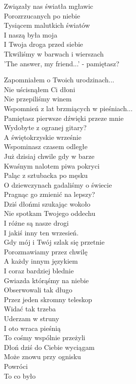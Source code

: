 
\begin{text}
    Związały nas światła mgławic\\
    Porozrzucanych po niebie\\
    Tysiącem malutkich światów\\
    I naszą była moja\\
    I Twoja droga przed siebie\\
    Tkwiliśmy w barwach i wierszach\\
    'The answer, my friend...' - pamiętasz?

    Zapomniałem o Twoich urodzinach...\\
    Nie uścisnąłem Ci dłoni\\
    Nie przepiliśmy winem\\
    Wspomnień z lat brzmiących w pieśniach...\\
    Pamiętasz pierwsze dźwięki przeze mnie\\
    Wydobyte z ogranej gitary?\\
    A świętokrzyskie wrześnie\\
    Wspominasz czasem odległe\\
    Już dzisiaj chwile gdy w barze\\
    Kwaśnym nalotem piwa pokryci\\
    Paląc z sztubacka po męsku\\
    O dziewczynach gadaliśmy o świecie\\
    Pragnąc go zmienić na lepszy?\\
    Dziś dłońmi szukając wokoło\\
    Nie spotkam Twojego oddechu\\
    I różne są nasze drogi\\
    I jakiś inny ten wrzesień.\\
    Gdy mój i Twój szlak się przetnie\\
    Porozmawiamy przez chwilę\\
    A każdy innym językiem\\
    I coraz bardziej blednie\\
    Gwiazda którąśmy na niebie\\
    Obserwowali tak długo\\
    Przez jeden skromny teleskop\\
    Widać tak trzeba\\
    Uderzam w struny\\
    I oto wraca pieśnią\\
    To cośmy wspólnie przeżyli\\
    Dłoń dziś do Ciebie wyciągam\\
    Może znowu przy ognisku\\
    Powróci\\
    To co było
\end{text}
\begin{chord}

\end{chord}